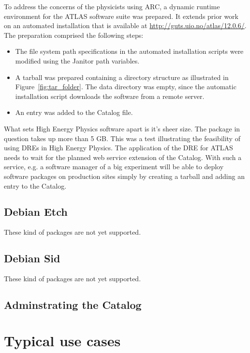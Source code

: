 To address the concerns of the physicists using ARC, a dynamic runtime environment for the
ATLAS software suite was prepared. It extends prior work on an automated installation that is available at
\href{http://guts.uio.no/atlas/12.0.6/}{http://guts.uio.no/atlas/12.0.6/}. The preparation comprised the following steps:
\begin{itemize}
    \item The file system path specifications in the automated installation scripts were modified using the Janitor
       path variables.
    \item A tarball was prepared containing a directory structure as illustrated in Figure~\ref{fig:tar_folder}. The data directory
       was empty, since the automatic installation script downloads the software from a remote server.
    \item An entry was added to the Catalog file.
\end{itemize}
What sets High Energy Physics software apart is it's sheer size. The package in question takes up more than
5 GB. This was a test illustrating the feasibility of using DREs in High Energy Physics. The application
of the DRE for ATLAS needs to wait for the planned web service extension of the Catalog. With such a
service, e.g. a software manager of a big experiment will be able to deploy software packages on production
sites simply by creating a tarball and adding an entry to the Catalog.


\subsection{Debian Etch}

These kind of packages are not yet supported.

\subsection{Debian Sid}

These kind of packages are not yet supported.

\subsection{Adminstrating the Catalog}

\section{Typical use cases}\label{sec:typical_use_cases}

